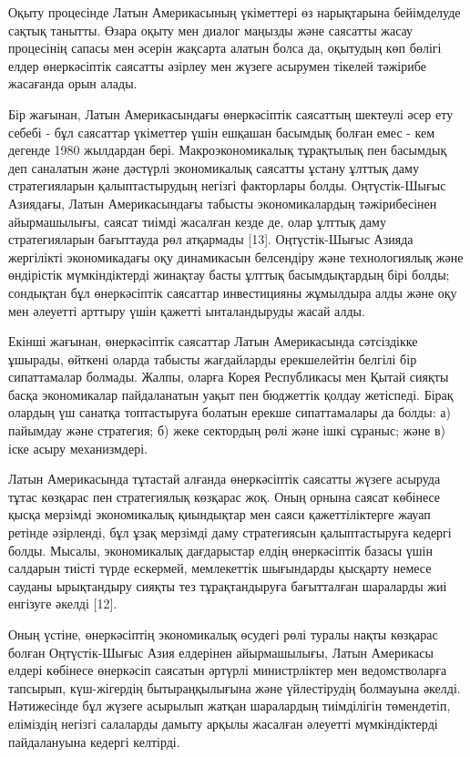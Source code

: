 \begin{multicols}{2}
Оқыту процесінде Латын Америкасының үкіметтері өз нарықтарына
бейімделуде сақтық танытты. Өзара оқыту мен диалог маңызды және саясатты
жасау процесінің сапасы мен әсерін жақсарта алатын болса да, оқытудың
көп бөлігі елдер өнеркәсіптік саясатты әзірлеу мен жүзеге асырумен
тікелей тәжірибе жасағанда орын алады.

Бір жағынан, Латын Америкасындағы өнеркәсіптік саясаттың шектеулі әсер
ету себебі - бұл саясаттар үкіметтер үшін ешқашан басымдық болған емес -
кем дегенде 1980 жылдардан бері. Макроэкономикалық тұрақтылық пен
басымдық деп саналатын және дәстүрлі экономикалық саясатты ұстану ұлттық
даму стратегияларын қалыптастырудың негізгі факторлары болды.
Оңтүстік-Шығыс Азиядағы, Латын Америкасындағы табысты экономикалардың
тәжірибесінен айырмашылығы, саясат тиімді жасалған кезде де, олар ұлттық
даму стратегияларын бағыттауда рөл атқармады {[}13{]}. Оңтүстік-Шығыс
Азияда жергілікті экономикадағы оқу динамикасын белсендіру және
технологиялық және өндірістік мүмкіндіктерді жинақтау басты ұлттық
басымдықтардың бірі болды; сондықтан бұл өнеркәсіптік саясаттар
инвестицияны жұмылдыра алды және оқу мен әлеуетті арттыру үшін қажетті
ынталандыруды жасай алды.

Екінші жағынан, өнеркәсіптік саясаттар Латын Америкасында сәтсіздікке
ұшырады, өйткені оларда табысты жағдайларды ерекшелейтін белгілі бір
сипаттамалар болмады. Жалпы, оларға Корея Республикасы мен Қытай сияқты
басқа экономикалар пайдаланатын уақыт пен бюджеттік қолдау жетіспеді.
Бірақ олардың үш санатқа топтастыруға болатын ерекше сипаттамалары да
болды: а) пайымдау және стратегия; б) жеке сектордың рөлі және ішкі
сұраныс; және в) іске асыру механизмдері.

Латын Америкасында тұтастай алғанда өнеркәсіптік саясатты жүзеге асыруда
тұтас көзқарас пен стратегиялық көзқарас жоқ. Оның орнына саясат
көбінесе қысқа мерзімді экономикалық қиындықтар мен саяси
қажеттіліктерге жауап ретінде әзірленді, бұл ұзақ мерзімді даму
стратегиясын қалыптастыруға кедергі болды. Мысалы, экономикалық
дағдарыстар елдің өнеркәсіптік базасы үшін салдарын тиісті түрде
ескермей, мемлекеттік шығындарды қысқарту немесе сауданы ырықтандыру
сияқты тез тұрақтандыруға бағытталған шараларды жиі енгізуге әкелді
{[}12{]}.

Оның үстіне, өнеркәсіптің экономикалық өсудегі рөлі туралы нақты
көзқарас болған Оңтүстік-Шығыс Азия елдерінен айырмашылығы, Латын
Америкасы елдері көбінесе өнеркәсіп саясатын әртүрлі министрліктер мен
ведомстволарға тапсырып, күш-жігердің бытыраңқылығына және үйлестірудің
болмауына әкелді. Нәтижесінде бұл жүзеге асырылып жатқан шаралардың
тиімділігін төмендетіп, еліміздің негізгі салаларды дамыту арқылы
жасалған әлеуетті мүмкіндіктерді пайдалануына кедергі келтірді.


\end{multicols}
